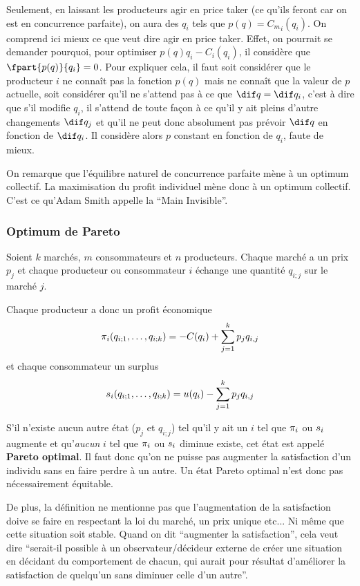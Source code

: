 Seulement, en laissant les producteurs agir en price taker
(ce qu'ils feront car on est en concurrence parfaite),
on aura des $q_i$ tels que $p(q) = {C_m}_i(q_i)$.
On comprend ici mieux ce que veut dire agir en price taker.
Effet, on pourrait se demander pourquoi, pour optimiser
$p(q)q_i - {C}_i(q_i)$, il considère que $\fpart{p(q)}{q_i} = 0$.
Pour expliquer cela,
il faut soit considérer que le producteur $i$ ne connaît pas la fonction $p(q)$
mais ne connaît que la valeur de $p$ actuelle, soit considérer qu'il
ne s'attend pas à ce que $\dif q = \dif q_i$, c'est à dire que s'il modifie
$q_i$, il s'attend de toute façon à ce qu'il y ait pleins d'autre changements
$\dif q_j$ et qu'il ne peut donc absolument pas prévoir $\dif q$ en fonction
de $\dif q_i$. Il considère alors $p$ constant en fonction de $q_i$,
faute de mieux.

On remarque que l'équilibre naturel de concurrence parfaite mène à
un optimum collectif.
La maximisation du profit individuel mène donc à un optimum collectif.
C'est ce qu'Adam Smith appelle la ``Main Invisible''.

\subsubsection{Optimum de Pareto}
Soient $k$ marchés, $m$ consommateurs et $n$ producteurs.
Chaque marché a un prix $p_j$ et chaque producteur ou consommateur $i$
échange une quantité $q_{i;j}$ sur le marché $j$.

Chaque producteur a donc un profit économique
\[ \pi_i(q_{i;1},\ldots,q_{i;k}) = -C(q_i) + \sum_{j=1}^k p_jq_{i,j} \]
et chaque consommateur un surplus
\[ s_i(q_{i;1},\ldots,q_{i;k}) = u(q_i) - \sum_{j=1}^k p_jq_{i,j} \]

S'il n'existe aucun autre état ($p_j$ et $q_{i;j}$)
tel qu'il y ait un $i$ tel que $\pi_i$ ou $s_i$ augmente et
qu'\emph{aucun} $i$ tel que $\pi_i$ ou $s_i$ diminue existe,
cet état est appelé \textbf{Pareto optimal}.
Il faut donc qu'on ne puisse pas augmenter la satisfaction d'un individu
sans en faire perdre à un autre.
Un état Pareto optimal n'est donc pas nécessairement équitable.

De plus,
la définition ne mentionne pas que l'augmentation de la satisfaction doive
se faire en respectant la loi du marché,
un prix unique etc...
Ni même que cette situation soit stable.
Quand on dit ``augmenter la satisfaction'',
cela veut dire ``serait-il possible à un observateur/décideur
externe de créer une situation en décidant du comportement de chacun,
qui aurait pour résultat d'améliorer la satisfaction
de quelqu'un sans diminuer celle d'un autre''.

